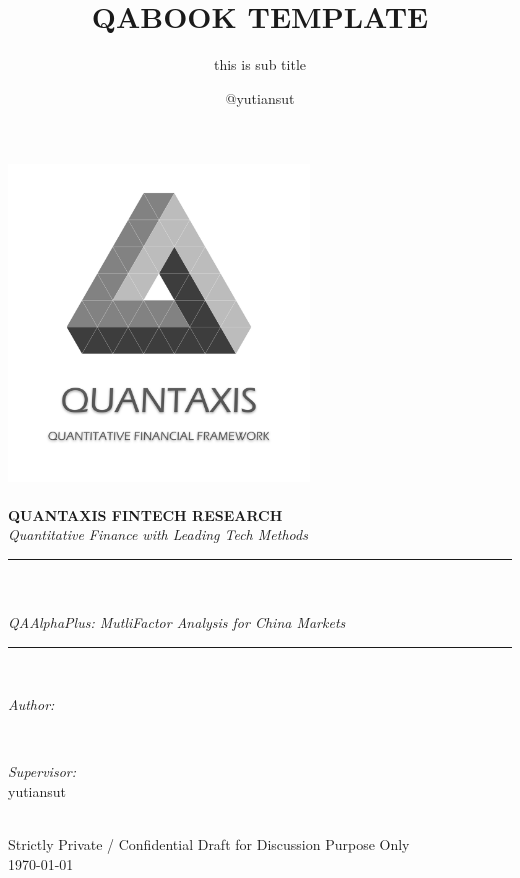 \documentclass{scrartcl}
\numberwithin{equation}{section}
\begin{document}
\title{QABOOK TEMPLATE}%
\subtitle{this is sub title}
\author{@yutiansut}
\begin{titlepage}
    \newcommand{\HRule}{\rule{\linewidth}{0.5mm}}
    \includegraphics[width=8cm]{title/qalogo.png}\\[1cm]
    \center
    \quad\\[1.5cm]
    \textbf{\Large  QUANTAXIS FINTECH RESEARCH }\\[0.5cm]
    \textsl{\large Quantitative Finance with Leading Tech Methods}\\[0.5cm]

    \makeatletter
    \HRule \\[0.4cm]
    { \huge \bfseries \@title}\\[0.4cm]
    \textsl{\large QAAlphaPlus: MutliFactor Analysis for China Markets}\\[0.5cm]
    \HRule \\[1.5cm]
    \begin{minipage}{0.4\textwidth}
        \begin{flushleft} \large
            \emph{Author:}\\
            \@author
        \end{flushleft}
    \end{minipage}
    ~
    \begin{minipage}{0.4\textwidth}
        \begin{flushright} \large
            \emph{Supervisor:} \\
            \textup{yutiansut}
        \end{flushright}
    \end{minipage}\\[2cm]
    \makeatother
    {\large Strictly Private / Confidential Draft for Discussion Purpose Only}\\[0.5cm]
    {\large \today}\\[1cm]
    \vfill
\end{titlepage}
\end{document}
